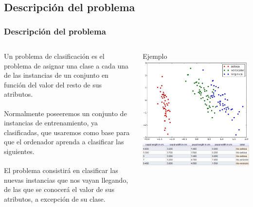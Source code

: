 \documentclass[8pt]{beamer}
\begin{document}
\subsection{Descripción del problema}
  \begin{frame}
    \frametitle{Descripción del problema}
    \begin{columns}[T]
    
     \begin{column}{.5\textwidth}
       \justifying
       Un problema de clasificación es el problema de asignar una clase a cada una de
       las instancias de un conjunto en función del valor del resto de sus atributos. 
       \\~\\
       Normalmente poseeremos un conjunto de instancias de entrenamiento, ya clasificadas, que
       usaremos como base para que el ordenador aprenda a clasificar las siguientes.
       \\~\\
       El problema consistirá en clasificar las nuevas instancias que nos vayan
       llegando, de las que se conocerá el valor de sus atributos, a excepción de su clase.
     \end{column}
     
     \begin{column}{.5\textwidth}
      \begin{block}{Ejemplo}
       \includegraphics[width=\textwidth]{imgs/plot_iris.png} \\
       \includegraphics[width=\textwidth]{imgs/iris_dataset.png}
      \end{block}
     \end{column}
     
    \end{columns}

  \end{frame}
\end{document}
